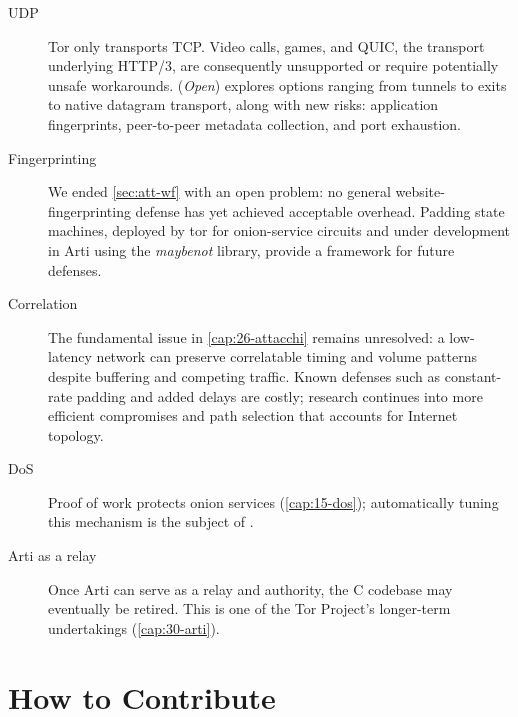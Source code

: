 \begin{description}
  \item[UDP] Tor only transports TCP. Video calls, games, and QUIC, the transport underlying HTTP/3, are consequently unsupported or require potentially unsafe workarounds.  (\emph{Open}) explores options ranging from tunnels to exits to native datagram transport, along with new risks: application fingerprints, peer-to-peer metadata collection, and port exhaustion.
  \item[Fingerprinting] We ended \cref{sec:att-wf} with an open problem: no general website-fingerprinting defense has yet achieved acceptable overhead. Padding state machines, deployed by tor for onion-service circuits and under development in Arti using the \emph{maybenot} library, provide a framework for future defenses.
  \item[Correlation] The fundamental issue in \cref{cap:26-attacchi} remains unresolved: a low-latency network can preserve correlatable timing and volume patterns despite buffering and competing traffic. Known defenses such as constant-rate padding and added delays are costly; research continues into more efficient compromises and path selection that accounts for Internet topology.
  \item[DoS] Proof of work protects onion services (\cref{cap:15-dos}); automatically tuning this mechanism is the subject of .
  \item[Arti as a relay] Once Arti can serve as a relay and authority, the C codebase may eventually be retired. This is one of the Tor Project's longer-term undertakings (\cref{cap:30-arti}).
\end{description}

\section{How to Contribute}\label{sec:fut-contribuire}

